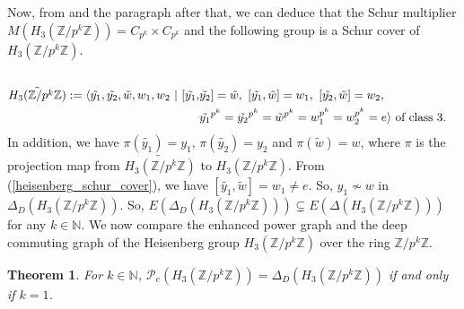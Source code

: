 \documentclass[12pt,a4paper]{article}
\newtheorem{theorem}{Theorem}[section]
\begin{document}
Now, from \cite[Theorem 1.1]{hatui} and the paragraph after that, we can deduce that the Schur multiplier $M(H_3(\mathbb{Z}/p^k\mathbb{Z}))=C_{p^k}\times C_{p^k}$ and the following group is a Schur cover of $H_3(\mathbb{Z}/p^k\mathbb{Z})$.
\begin{equation}\label{heisenberg_schur_cover}
  \begin{aligned}\\
     \tilde{H_3(\mathbb{Z}/p^k\mathbb{Z})}:=\langle \tilde{y_1},\tilde{y_2},\tilde{w},w_1,w_2~\vert~[\tilde{y_1},&\tilde{y_2}]=\tilde{w},~[\tilde{y_1},\tilde{w}]=w_1,~[\tilde{y_2},\tilde{w}]=w_2,\\
     &\tilde{y_1}^{p^k}=\tilde{y_2}^{p^k}=\tilde{w}^{p^k}=w_1^{p^k}=w_2^{p^k}=e\rangle~\text{of class }3.\\
    \end{aligned}\\
\end{equation}
In addition, we have $\pi(\tilde{y_1})=y_1$, $\pi(\tilde{y_2})=y_2$ and $\pi(\tilde{w})=w$, where $\pi$ is the projection map from $\tilde{H_3(\mathbb{Z}/p^k\mathbb{Z})}$ to $H_3(\mathbb{Z}/p^k\mathbb{Z})$. From (\ref{heisenberg_schur_cover}), we have $[\tilde{y_1},\tilde{w}]=w_1\neq e$. So, $y_1\nsim w$ in $\Delta_D(H_3(\mathbb{Z}/p^k\mathbb{Z}))$. So, $E(\Delta_D(H_3(\mathbb{Z}/p^k\mathbb{Z})))\subsetneq E(\Delta(H_3(\mathbb{Z}/p^k\mathbb{Z})))$ for any $k\in\mathbb{N}$. We now compare the enhanced power graph and the deep commuting graph of the Heisenberg group $H_3(\mathbb{Z}/p^k\mathbb{Z})$ over the ring $\mathbb{Z}/p^k\mathbb{Z}$.
\begin{theorem}\label{heisenberg_equality}
For $k\in\mathbb{N}$, $\mathcal{P}_e(H_3(\mathbb{Z}/p^k\mathbb{Z}))=\Delta_D(H_3(\mathbb{Z}/p^k\mathbb{Z}))$ if and only if $k=1$.    
\end{theorem}
\end{document}
